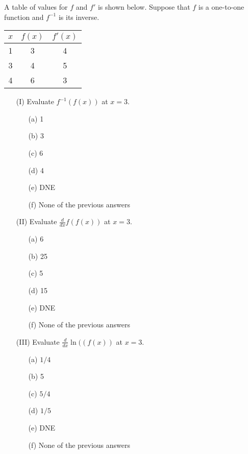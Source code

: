 \documentclass[handout,nooutcomes]{ximera}
\newcommand{\ddx}{\frac{d}{dx}}
\begin{document}
\begin{problem}
  A table of values for $f$ and $f'$ is shown below.
  Suppose that $f$ is a one-to-one function and $f^{-1}$ is its inverse.
  \begin{center}
    \begin{tabular}{ccc}
      \toprule
      $x$ & $f(x)$ & $f'(x)$\\
      \midrule
      1 & 3 & 4\\
      3 & 4 & 5\\
      4 & 6 & 3\\
      \bottomrule
    \end{tabular}
  \end{center}

  \begin{itemize}
    \item[(I)] Evaluate $f^{-1}(f(x))$ at $x = 3$.
      \begin{itemize}
        \item[(a)] 1
        \item[(b)] 3
        \item[(c)] 6
        \item[(d)] 4
        \item[(e)] DNE
        \item[(f)] None of the previous answers
      \end{itemize}

    \item[(II)] Evaluate $\ddx f(f(x))$ at $x = 3$.
      \begin{itemize}
        \item[(a)] 6
        \item[(b)] 25
        \item[(c)] 5
        \item[(d)] 15
        \item[(e)] DNE
        \item[(f)] None of the previous answers
      \end{itemize}

    \item[(III)] Evaluate $\ddx \ln((f(x))$ at $x = 3$.
      \begin{itemize}
        \item[(a)] $1/4$
        \item[(b)] 5
        \item[(c)] $5/4$
        \item[(d)] $1/5$
        \item[(e)] DNE
        \item[(f)] None of the previous answers
      \end{itemize}


\end{itemize}
\end{problem}
\end{document}
